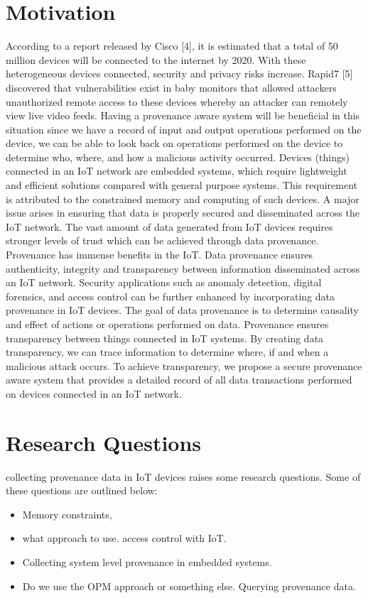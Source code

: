 \section{Motivation}
According to a report released by Cisco [4], it is estimated that a total of 50 million devices will be
connected to the internet by 2020. With these heterogeneous devices connected,
security and privacy risks increase. Rapid7 [5] discovered that vulnerabilities exist in
baby monitors that allowed attackers unauthorized remote access to these devices
whereby an attacker can remotely view live video feeds. Having a provenance aware
system will be beneficial in this situation since we have a record of input and output
operations performed on the device, we can be able to look back on operations
performed on the device to determine who, where, and how a malicious activity
occurred. Devices (things) connected in an IoT network are embedded systems, which
require lightweight and efficient solutions compared with general purpose
systems.
This requirement is attributed to the constrained memory and computing of such
devices. A major issue arises in ensuring that data is properly secured and
disseminated across the IoT network. The vast amount of data generated from IoT
devices requires stronger levels of trust which can be achieved through data
provenance. Provenance has immense benefits in the IoT. Data provenance ensures
authenticity, integrity and transparency between information disseminated across an
IoT network. Security applications such as anomaly detection, digital forensics, and
access control can be further enhanced by incorporating data provenance in IoT
devices. The goal of data provenance is to determine causality and effect of actions or
operations performed on data. Provenance ensures transparency between things
connected in IoT systems. By creating data transparency, we can trace information to
determine where, if and when a malicious attack occurs. To achieve transparency, we
propose a secure provenance aware system that provides a detailed record of all data
transactions performed on devices connected in an IoT network.

\section{Research Questions}
collecting provenance data in IoT devices raises some research questions. Some of these questions are outlined below:

\begin{itemize}

\item Memory constraints, 

\item what approach to use. access control with IoT. 

\item Collecting system level provenance in embedded systems. 

\item Do we use the OPM approach or something else. Querying provenance data.
\end{itemize}

